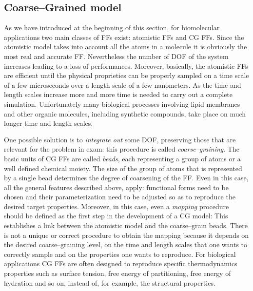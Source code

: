 \subsection{Coarse--Grained model}
\label{sec:CGModel}
As we have introduced at the beginning of this section, for biomolecular applications two main classes of \acp{FF} exist: atomistic \acp{FF} and \ac{CG} \acp{FF}. Since the atomistic model takes into account all the atoms in a molecule it is obviously the most real and accurate \ac{FF}. Nevertheless the number of \ac{DOF} of the system increases leading to a loss of performances. Moreover, basically, the atomistic \acp{FF} are efficient until the physical proprieties can be properly sampled on a time scale of a few microseconds over a length scale of a few nanometers. As the time and length scales increase more and more time is needed to carry out a complete simulation. Unfortunately many biological processes involving lipid membranes and other organic molecules, including synthetic compounds, take place on much longer time and length scales.

One possible solution is to \textit{integrate out} some \ac{DOF}, preserving those that are relevant for the problem in exam: this procedure is called \textit{coarse--graining}. The basic units of \ac{CG} \acp{FF} are called \textit{beads}, each representing a group of atoms or a well defined chemical moiety. The size of the group of atoms that is represented by a single bead determines the degree of coarsening of the \ac{FF}. Even in this case, all the general features described above, apply: functional forms need to be chosen and their parameterization need to be adjusted so as to reproduce the desired target properties. Moreover, in this case, even a \textit{mapping} procedure should be defined as the first step in the development of a \ac{CG} model: This establishes a link between the atomistic model and the coarse--grain beads. There is not a unique or correct procedure to obtain the mapping because it depends on the desired coarse--graining level, on the time and length scales that one wants to correctly sample and on the properties one wants to reproduce. For biological applications \ac{CG} \acp{FF} are often designed to reproduce specific thermodynamics properties such as surface tension, free energy of partitioning, free energy of hydration and so on, instead of, for example, the structural properties.

